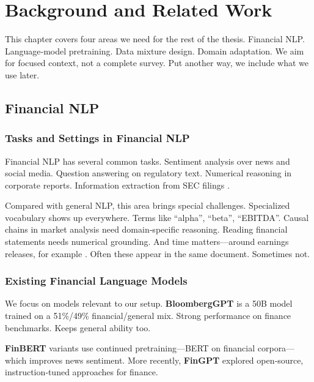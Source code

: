 \chapter{Background and Related Work}

This chapter covers four areas we need for the rest of the thesis. Financial NLP. Language‑model pretraining. Data mixture design. Domain adaptation. We aim for focused context, not a complete survey. Put another way, we include what we use later.

\section{Financial NLP}

\subsection{Tasks and Settings in Financial NLP}

Financial NLP has several common tasks. Sentiment analysis over news and social media. Question answering on regulatory text. Numerical reasoning in corporate reports. Information extraction from SEC filings \parencite{araci2019finbert, chen2021finqa}.

Compared with general NLP, this area brings special challenges. Specialized vocabulary shows up everywhere. Terms like ``alpha'', ``beta'', ``EBITDA''. Causal chains in market analysis need domain‑specific reasoning. Reading financial statements needs numerical grounding. And time matters—around earnings releases, for example \parencite{wu2023bloomberggpt, araci2019finbert}. Often these appear in the same document. Sometimes not.

\subsection{Existing Financial Language Models}

We focus on models relevant to our setup. \textbf{BloombergGPT} \parencite{wu2023bloomberggpt} is a 50B model trained on a 51\%/49\% financial/general mix. Strong performance on finance benchmarks. Keeps general ability too.

\textbf{FinBERT} variants \parencite{araci2019finbert, yang2020finbert} use continued pretraining—BERT on financial corpora—which improves news sentiment. More recently, \textbf{FinGPT} \parencite{yang2023fingpt} explored open‑source, instruction‑tuned approaches for finance.

